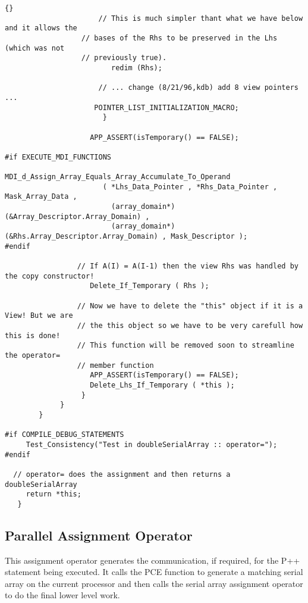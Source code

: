 \documentclass[10pt]{llncs}
\begin{document}
\begin{lstlisting}{}
                      // This is much simpler thant what we have below and it allows the 
	              // bases of the Rhs to be preserved in the Lhs (which was not 
	              // previously true).
                         redim (Rhs);

                      // ... change (8/21/96,kdb) add 8 view pointers ...
	                 POINTER_LIST_INITIALIZATION_MACRO;
                       }

                    APP_ASSERT(isTemporary() == FALSE);

#if EXECUTE_MDI_FUNCTIONS
                    MDI_d_Assign_Array_Equals_Array_Accumulate_To_Operand
                       ( *Lhs_Data_Pointer , *Rhs_Data_Pointer , Mask_Array_Data ,
                         (array_domain*) (&Array_Descriptor.Array_Domain) , 
                         (array_domain*) (&Rhs.Array_Descriptor.Array_Domain) , Mask_Descriptor );
#endif

                 // If A(I) = A(I-1) then the view Rhs was handled by the copy constructor!
                    Delete_If_Temporary ( Rhs );

                 // Now we have to delete the "this" object if it is a View! But we are 
                 // the this object so we have to be very carefull how this is done!
                 // This function will be removed soon to streamline the operator= 
                 // member function
                    APP_ASSERT(isTemporary() == FALSE);
                    Delete_Lhs_If_Temporary ( *this );
                  }
             }
        }

#if COMPILE_DEBUG_STATEMENTS
     Test_Consistency("Test in doubleSerialArray :: operator=");
#endif

  // operator= does the assignment and then returns a doubleSerialArray
     return *this;
   }
\end{lstlisting}


\newpage
\subsection{Parallel Assignment Operator}

   This assignment operator generates the communication, if required, for the P++ statement
being executed.  It calls the PCE function to generate a matching serial array on the current processor
and then calls the serial array assignment operator to do the final lower level work.

\vspace{0.5in}
\end{document}
